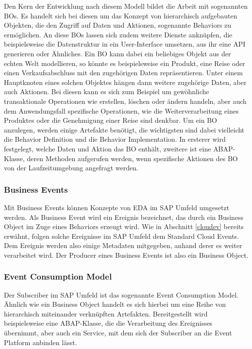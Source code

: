 Den Kern der Entwicklung nach diesem Modell bildet die Arbeit mit sogenannten \ac{BO}s. Es handelt sich bei diesen um das Konzept von hierarchisch aufgebauten Objekten, die den Zugriff auf Daten und Aktionen, sogenannte Behaviors zu ermöglichen. An diese \ac{BO}s lassen sich zudem weitere Dienste anknüpfen, die beispielsweise die Datenstruktur in ein User-Interface umsetzen, aus ihr eine \ac{API} generieren oder Ähnliches. Ein \ac{BO} kann dabei ein beliebiges Objekt aus der echten Welt modellieren, so könnte es beispielsweise ein Produkt, eine Reise oder einen Verkaufsabschluss mit den zugehörigen Daten repräsentieren. Unter einem Hauptknoten eines solchen Objektes hängen dann weitere zugehörige Daten, aber auch Aktionen. Bei diesen kann es sich zum Beispiel um gewöhnliche transaktionale Operationen wie erstellen, löschen oder ändern handeln, aber auch dem Anwendungsfall spezifische Operationen, wie die Weiterverarbeitung eines Produktes oder die Genehmigung einer Reise sind denkbar. Um ein \ac{BO} anzulegen, werden einige Artefakte benötigt, die wichtigsten sind dabei vielleicht die Behavior Definition und die Behavior Implementation. In ersterer wird festgelegt, welche Daten und Aktion das \ac{BO} enthält, zweitere ist eine \ac{ABAP}-Klasse, deren Methoden aufgerufen werden, wenn spezifische Aktionen des \ac{BO} von der Laufzeitumgebung angefragt werden. \citepls

\subsubsection*{Business Events}
Mit Business Events können Konzepte von \ac{EDA} im SAP Umfeld umgesetzt werden. Als Business Event wird ein Ereignis bezeichnet, das durch ein Business Object im Zuge eines Behaviors erzeugt wird. Wie in Abschnitt \ref{cloudev} bereits erwähnt, folgen solche Ereignisse im SAP Umfeld dem Standard Cloud Events. Dem Ereignis werden also einige Metadaten mitgegeben, anhand derer es weiter verarbeitet wird. Der Producer eines Business Events ist also ein Business Object. 

\subsubsection*{Event Consumption Model}
\label{ecm}
Der Subscriber im SAP Umfeld ist das sogenannte Event Consumption Model. Ähnlich wie ein Business Object handelt es sich hierbei um eine Reihe von hierarchisch miteinander verknüpften Artefakten. Bereitgestellt wird beispielsweise eine \ac{ABAP}-Klasse, die die Verarbeitung des Ereignisses übernimmt, aber auch ein Service, mit dem sich der Subscriber an die Event Platform anbinden lässt. \citepls

